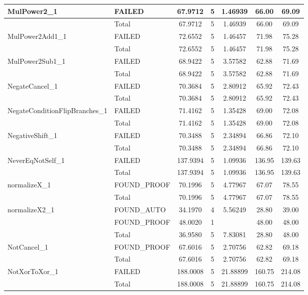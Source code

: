 \begin{appendices}
\begin{longtable}{L{0.25\textwidth} L{0.2\textwidth}  c  c  c  c  c }
    MulPower2\_1 & FAILED & 67.9712 & 5 & 1.46939 & 66.00 & 69.09 \\ \midrule 
    & Total & 67.9712 & 5 & 1.46939 & 66.00 & 69.09 \\ \midrule 
    MulPower2Add1\_1 & FAILED & 72.6552 & 5 & 1.46457 & 71.98 & 75.28 \\ \midrule 
    & Total & 72.6552 & 5 & 1.46457 & 71.98 & 75.28 \\ \midrule 
    MulPower2Sub1\_1 & FAILED & 68.9422 & 5 & 3.57582 & 62.88 & 71.69 \\ \midrule 
    & Total & 68.9422 & 5 & 3.57582 & 62.88 & 71.69 \\ \midrule 
    NegateCancel\_1 & FAILED & 70.3684 & 5 & 2.80912 & 65.92 & 72.43 \\ \midrule 
    & Total & 70.3684 & 5 & 2.80912 & 65.92 & 72.43 \\ \midrule 
    NegateConditionFlipBranches\_1 & FAILED & 71.4162 & 5 & 1.35428 & 69.00 & 72.08 \\ \midrule 
    & Total & 71.4162 & 5 & 1.35428 & 69.00 & 72.08 \\ \midrule 
    NegativeShift\_1 & FAILED & 70.3488 & 5 & 2.34894 & 66.86 & 72.10 \\ \midrule 
    & Total & 70.3488 & 5 & 2.34894 & 66.86 & 72.10 \\ \midrule 
    NeverEqNotSelf\_1 & FAILED & 137.9394 & 5 & 1.09936 & 136.95 & 139.63 \\ \midrule 
    & Total & 137.9394 & 5 & 1.09936 & 136.95 & 139.63 \\ \midrule 
    normalizeX\_1 & FOUND\_PROOF & 70.1996 & 5 & 4.77967 & 67.07 & 78.55 \\ \midrule 
    & Total & 70.1996 & 5 & 4.77967 & 67.07 & 78.55 \\ \midrule 
    normalizeX2\_1 & FOUND\_AUTO & 34.1970 & 4 & 5.56249 & 28.80 & 39.00 \\ \midrule 
    & FOUND\_PROOF & 48.0020 & 1 &  & 48.00 & 48.00 \\ \midrule 
    & Total & 36.9580 & 5 & 7.83081 & 28.80 & 48.00 \\ \midrule 
    NotCancel\_1 & FOUND\_PROOF & 67.6016 & 5 & 2.70756 & 62.82 & 69.18 \\ \midrule 
    & Total & 67.6016 & 5 & 2.70756 & 62.82 & 69.18 \\ \midrule 
    NotXorToXor\_1 & FAILED & 188.0008 & 5 & 21.88899 & 160.75 & 214.08 \\ \midrule 
    & Total & 188.0008 & 5 & 21.88899 & 160.75 & 214.08 \\ \midrule 

\end{longtable}
\end{appendices}
